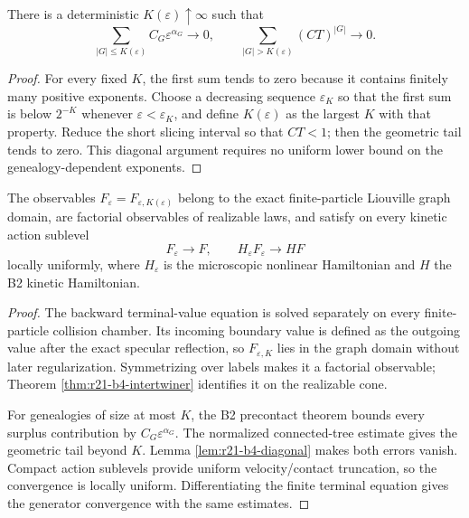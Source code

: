 \begin{lemma}
\label{lem:r21-b4-diagonal}
There is a deterministic $K(\varepsilon)\uparrow\infty$ such that
\[
 \sum_{|G|\le K(\varepsilon)}C_G\varepsilon^{\alpha_G}\to0,
 \qquad
 \sum_{|G|>K(\varepsilon)}(CT)^{|G|}\to0.
\]
\end{lemma}

\begin{proof}
For every fixed $K$, the first sum tends to zero because it contains finitely
many positive exponents.  Choose a decreasing sequence
$\varepsilon_K$ so that the first sum is below $2^{-K}$ whenever
$\varepsilon<\varepsilon_K$, and define $K(\varepsilon)$ as the largest $K$
with that property.  Reduce the short slicing interval so that $CT<1$; then
the geometric tail tends to zero.  This diagonal argument requires no
uniform lower bound on the genealogy-dependent exponents.
\end{proof}

\begin{theorem}
\label{thm:r21-b4-corrector}
The observables $F_\varepsilon=F_{\varepsilon,K(\varepsilon)}$ belong to the
exact finite-particle Liouville graph domain, are factorial observables of
realizable laws, and satisfy on every kinetic action sublevel
\[
 F_\varepsilon\to F,
 \qquad
 H_\varepsilon F_\varepsilon\to HF
\]
locally uniformly, where $H_\varepsilon$ is the microscopic nonlinear
Hamiltonian and $H$ the B2 kinetic Hamiltonian.
\end{theorem}

\begin{proof}
The backward terminal-value equation is solved separately on every
finite-particle collision chamber.  Its incoming boundary value is defined as
the outgoing value after the exact specular reflection, so
$F_{\varepsilon,K}$ lies in the graph domain without later regularization.
Symmetrizing over labels makes it a factorial observable; Theorem
\ref{thm:r21-b4-intertwiner} identifies it on the realizable cone.

For genealogies of size at most $K$, the B2 precontact theorem bounds every
surplus contribution by $C_G\varepsilon^{\alpha_G}$.  The normalized
connected-tree estimate gives the geometric tail beyond $K$.  Lemma
\ref{lem:r21-b4-diagonal} makes both errors vanish.  Compact action sublevels
provide uniform velocity/contact truncation, so the convergence is locally
uniform.  Differentiating the finite terminal equation gives the generator
convergence with the same estimates.
\end{proof}

